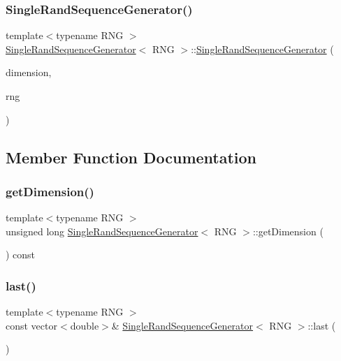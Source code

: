 \subsubsection{\texorpdfstring{Single\+Rand\+Sequence\+Generator()}{SingleRandSequenceGenerator()}}
{\footnotesize\ttfamily template$<$typename R\+NG $>$ \\
\hyperlink{class_single_rand_sequence_generator}{Single\+Rand\+Sequence\+Generator}$<$ R\+NG $>$\+::\hyperlink{class_single_rand_sequence_generator}{Single\+Rand\+Sequence\+Generator} (\begin{DoxyParamCaption}\item[{vector$<$ double $>$\+::size\+\_\+type}]{dimension,  }\item[{const R\+NG \&}]{rng }\end{DoxyParamCaption})}



\subsection{Member Function Documentation}
\hypertarget{class_single_rand_sequence_generator_a36364446f579ca7e97b6e832eae5a4ad}{}\label{class_single_rand_sequence_generator_a36364446f579ca7e97b6e832eae5a4ad} 
\subsubsection{\texorpdfstring{get\+Dimension()}{getDimension()}}
{\footnotesize\ttfamily template$<$typename R\+NG $>$ \\
unsigned long \hyperlink{class_single_rand_sequence_generator}{Single\+Rand\+Sequence\+Generator}$<$ R\+NG $>$\+::get\+Dimension (\begin{DoxyParamCaption}{ }\end{DoxyParamCaption}) const\hspace{0.3cm}{\ttfamily [inline]}}

\hypertarget{class_single_rand_sequence_generator_a55a7be74efb71301267ff5aaff8349a9}{}\label{class_single_rand_sequence_generator_a55a7be74efb71301267ff5aaff8349a9} 
\subsubsection{\texorpdfstring{last()}{last()}}
{\footnotesize\ttfamily template$<$typename R\+NG $>$ \\
const vector$<$double$>$\& \hyperlink{class_single_rand_sequence_generator}{Single\+Rand\+Sequence\+Generator}$<$ R\+NG $>$\+::last (\begin{DoxyParamCaption}{ }\end{DoxyParamCaption})\hspace{0.3cm}{\ttfamily [inline]}}

